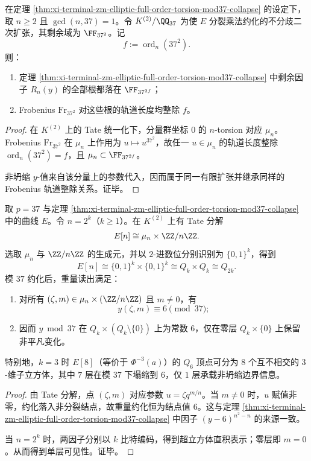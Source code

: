 \begin{proposition}\label{prop:xi-terminal-zm-noncollapsed-boundary-frobenius-period}
在定理 \ref{thm:xi-terminal-zm-elliptic-full-order-torsion-mod37-collapse} 的设定下，取 \(n\ge 2\) 且 \(\gcd(n,37)=1\)。令 \(K^{(2)}/\QQ_{37}\) 为使 \(E\) 分裂乘法约化的不分歧二次扩张，其剩余域为 \(\FF_{37^2}\)。记
\[
f:=\operatorname{ord}_{n}(37^2).
\]
则：
\begin{enumerate}
  \item 定理 \ref{thm:xi-terminal-zm-elliptic-full-order-torsion-mod37-collapse} 中剩余因子 \(R_n(y)\) 的全部根都落在 \(\FF_{37^{2f}}\)；
  \item Frobenius \(\mathrm{Fr}_{37^2}\) 对这些根的轨道长度均整除 \(f\)。
\end{enumerate}
\end{proposition}
\begin{proof}
在 \(K^{(2)}\) 上的 Tate 统一化下，分量群坐标 \(0\) 的 \(n\)-torsion 对应 \(\mu_n\)。Frobenius \(\mathrm{Fr}_{37^2}\) 在 \(\mu_n\) 上作用为 \(u\mapsto u^{37^2}\)，故任一 \(u\in\mu_n\) 的轨道长度整除 \(\operatorname{ord}_n(37^2)=f\)，且 \(\mu_n\subset \FF_{37^{2f}}\)。

非坍缩 \(y\)-值来自该分量上的参数代入，因而属于同一有限扩张并继承同样的 Frobenius 轨道整除关系。证毕。
\end{proof}

\begin{theorem}\label{thm:xi-terminal-zm-tate-hypercube-single-layer-visibility}
取 \(p=37\) 与定理 \ref{thm:xi-terminal-zm-elliptic-full-order-torsion-mod37-collapse} 中的曲线 \(E\)。令 \(n=2^k\)（\(k\ge 1\)）。在 \(K^{(2)}\) 上有 Tate 分解
\[
E[n]\cong \mu_n\times \ZZ/n\ZZ.
\]
选取 \(\mu_n\) 与 \(\ZZ/n\ZZ\) 的生成元，并以 \(2\)-进数位分别识别为 \(\{0,1\}^k\)，得到
\[
E[n]\cong \{0,1\}^k\times \{0,1\}^k\cong Q_k\times Q_k\cong Q_{2k}.
\]
模 \(37\) 约化后，重量读出满足：
\begin{enumerate}
  \item 对所有 \((\zeta,m)\in \mu_n\times(\ZZ/n\ZZ)\) 且 \(m\neq 0\)，有
  \[
  y(\zeta,m)\equiv 6\pmod{37};
  \]
  \item 因而 \(y\bmod 37\) 在 \(Q_k\times (Q_k\setminus\{0\})\) 上为常数 \(6\)，仅在零层 \(Q_k\times\{0\}\) 上保留非平凡变化。
\end{enumerate}
特别地，\(k=3\) 时 \(E[8]\)（等价于 \(\Phi^{-3}(a)\)）的 \(Q_6\) 顶点可分为 \(8\) 个互不相交的 \(3\)-维子立方体，其中 \(7\) 层在模 \(37\) 下塌缩到 \(6\)，仅 \(1\) 层承载非坍缩边界信息。
\end{theorem}
\begin{proof}
由 Tate 分解，点 \((\zeta,m)\) 对应参数 \(u=\zeta q^{m/n}\)。当 \(m\neq 0\) 时，\(u\) 赋值非零，约化落入非分裂结点，故重量约化恒为结点值 \(6\)。这与定理 \ref{thm:xi-terminal-zm-elliptic-full-order-torsion-mod37-collapse} 中因子 \((y-6)^{n^2-n}\) 的来源一致。

当 \(n=2^k\) 时，两因子分别以 \(k\) 比特编码，得到超立方体直积表示；零层即 \(m=0\)。从而得到单层可见性。证毕。
\end{proof}


